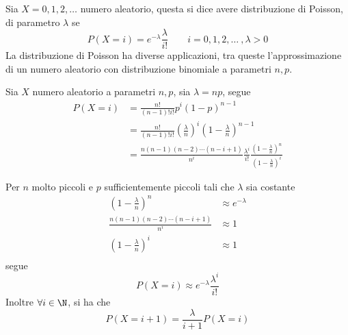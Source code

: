 \documentclass{subfiles}
\begin{document}
Sia \(X = 0, 1, 2, \dots\) numero aleatorio, questa si dice avere distribuzione di Poisson, di parametro \(\lambda\) se
\[
    P(X = i) = e^{-\lambda} \frac{\lambda}{i!} \qquad i = 0, 1, 2, \dots \ , \lambda > 0
\]
La distribuzione di Poisson ha diverse applicazioni, tra queste l'approssimazione di un numero aleatorio con distribuzione binomiale a parametri \(n, p\).
\begin{Proof*}
    Sia \(X\) numero aleatorio a parametri \(n, p\), sia \(\lambda = np\), segue
    \[\begin{aligned}
            P(X = i) & = \frac{n!}{(n - 1)! i!} p^{i}(1 - p)^{n - 1}                                                                                                                  \\
                     & = \frac{n!}{(n - 1)! i!} \left(\frac{\lambda}{n}\right)^{i}\left(1 - \frac{\lambda}{n}\right)^{n - 1}                                                          \\
                     & = \frac{n(n - 1)(n - 2) \cdots (n - i + 1)}{n^{i}} \frac{\lambda^{i}}{i!}\frac{\left(1 - \frac{\lambda}{n}\right)^{n}}{\left(1 - \frac{\lambda}{n}\right)^{i}}
        \end{aligned}\]
\end{Proof*}
Per \(n\) molto piccoli e \(p\) sufficientemente piccoli tali che \(\lambda\) sia costante
\[\begin{aligned}
        \left(1 - \frac{\lambda}{n}\right)^{n}           & \approx e^{-\lambda} \\
        \frac{n(n - 1)(n - 2) \cdots (n - i + 1)}{n^{i}} & \approx 1            \\
        \left(1 - \frac{\lambda}{n}\right)^{i}           & \approx 1            \\
    \end{aligned}\]
segue
\[
    P(X = i) \approx e^{-\lambda} \frac{\lambda^{i}}{i!}
\]
Inoltre \(\forall i \in \N\), si ha che
\[
    P(X = i + 1) = \frac{\lambda}{i + 1} P(X = i)
\]
\clearpage
\end{document}
